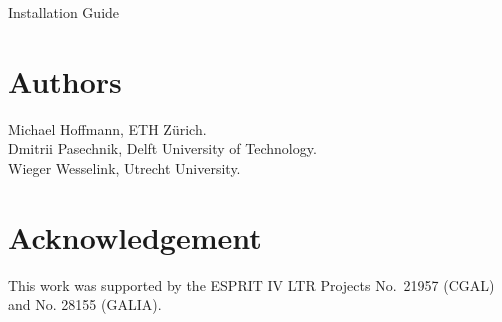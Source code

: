 \documentclass[twoside]{article}
\begin{document}
\pagestyle{empty}
\begin{titlepage}\mbox{}\vspace{3cm}
\vspace{2cm}

\centerline{{\huge Installation Guide}}\vspace{2cm}

\centerline{{\Large \cgalversion}}\vspace{1cm}

\centerline{{\Large \cgalversiondate}}
\end{titlepage}  

\setcounter{page}{2}
\section*{Authors}

Michael Hoffmann, ETH Z\"urich.\\
Dmitrii Pasechnik, Delft University of Technology.\\
Wieger Wesselink, Utrecht University.

\section*{Acknowledgement}

This work was supported by the ESPRIT IV LTR Projects No.~21957 (CGAL)
and No. 28155 (GALIA).

\cleardoublepage
\pagestyle{plain}
\setcounter{page}{1}
\tableofcontents
\cleardoublepage
{}
\cgalColumnLayout
 

\appendix





\printindex
\end{document}
